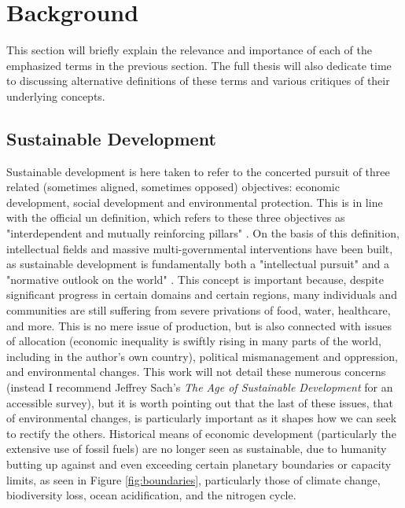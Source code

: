 \documentclass[notitlepage]{article}
\begin{document}
\section{Background}

This section will briefly explain the relevance and importance of each of the emphasized terms in the previous section. The full thesis will also dedicate time to discussing alternative definitions of these terms and various critiques of their underlying concepts.

\subsection{Sustainable Development} \label{sec:sustain}

Sustainable development is here taken to refer to the concerted pursuit of three related (sometimes aligned, sometimes opposed) objectives: economic development, social development and environmental protection. This is in line with the official \ac{un} definition, which refers to these three objectives as "interdependent and mutually reinforcing pillars" \cite{worldsummitonsustainabledevelopmentPlanImplementationWorld2002}. On the basis of this definition, intellectual fields and massive multi-governmental interventions have been built, as sustainable development is fundamentally both a "intellectual pursuit" and a "normative outlook on the world" \cite{sachsAgeSustainableDevelopment2015}. This concept is important because, despite significant progress in certain domains and certain regions, many individuals and communities are still suffering from severe privations of food, water, healthcare, and more. This is no mere issue of production, but is also connected with issues of allocation (economic inequality is swiftly rising in many parts of the world, including in the author's own country), political mismanagement and oppression, and environmental changes. This work will not detail these numerous concerns (instead I recommend Jeffrey Sach's \textit{The Age of Sustainable Development} for an accessible survey), but it is worth pointing out that the last of these issues, that of environmental changes, is particularly important as it shapes how we can seek to rectify the others. Historical means of economic development (particularly the extensive use of fossil fuels) are no longer seen as sustainable, due to humanity butting up against and even exceeding certain planetary boundaries or capacity limits, as seen in Figure \ref{fig:boundaries}, particularly those of climate change, biodiversity loss, ocean acidification, and the nitrogen cycle.
\end{document}
